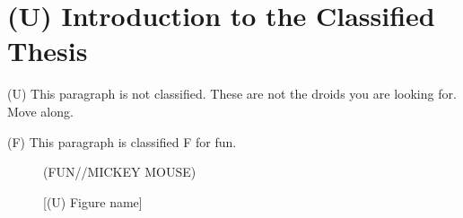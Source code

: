 %

\chapter{(U) Introduction to the Classified Thesis}\label{ch:marked}

(U) This paragraph is not classified. These are not the droids you are
looking for. Move along. 

(F) This paragraph is classified F for fun.

\begin{figure}[h]
\begin{smarkenv}{(FUN//MICKEY MOUSE)}
\framebox[\textwidth]{\parbox{\textwidth}{\lipsum[1]}} %
\end{smarkenv}
\caption[{[(U) Alternate short name]}]{[(U) Figure name]}
\end{figure}

